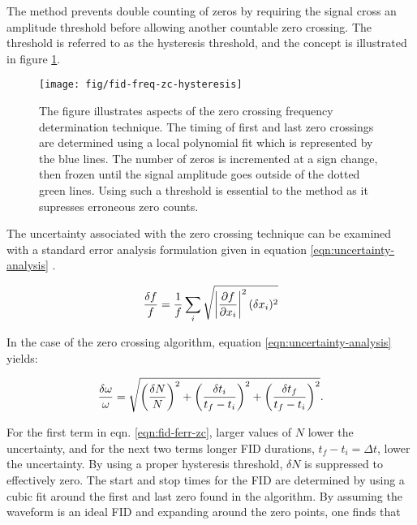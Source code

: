 \noindent
The method prevents double counting of zeros by requiring the signal cross an amplitude threshold before allowing another countable zero crossing.  The threshold is referred to as the hysteresis threshold, and the concept is illustrated in figure \ref{fig:fid-freq-zc-hysteresis}.

\begin{figure}
\label{fig:fid-freq-zc-hysteresis}
\texttt{[image: fig/fid-freq-zc-hysteresis]}
\caption{The figure illustrates aspects of the zero crossing frequency determination technique.  The timing of first and last zero crossings are determined using a local polynomial fit which is represented by the blue lines.  The number of zeros is incremented at a sign change, then frozen until the signal amplitude goes outside of the dotted green lines.  Using such a threshold is essential to the method as it supresses erroneous zero counts.}
\end{figure}

The uncertainty associated with the zero crossing technique can be examined with a standard error analysis formulation given in equation \ref{eqn:uncertainty-analysis} \cite{error-taylor}.

\begin{equation}
\label{eqn:uncertainty-analysis}
\frac{\delta f}{f} = \frac{1}{f} \sum_{i} \\
\sqrt{\left| \frac{\partial f}{\partial x_i} \right|^2 (\delta x_i)^2}
\end{equation}

\noindent
In the case of the zero crossing algorithm, equation \ref{eqn:uncertainty-analysis} yields:

\begin{equation}
\label{eqn:fid-ferr-zc}
\frac{\delta \omega}{\omega} = \\
\sqrt{
    \left( \frac{\delta N}{N} \right)^2 +
    \left( \frac{\delta t_i}{t_f - t_i} \right)^2 + 
    \left( \frac{\delta t_f}{t_f - t_i} \right)^2
    }.
\end{equation}

\noindent
For the first term in eqn. \ref{eqn:fid-ferr-zc}, larger values of $N$ lower the uncertainty, and for the next two terms longer FID durations, $t_f - t_i = \Delta t$, lower the uncertainty.  By using a proper hysteresis threshold, $\delta N$ is suppressed to effectively zero. The start and stop times for the FID are determined by using a cubic fit around the first and last zero found in the algorithm.  By assuming the waveform is an ideal FID and expanding around the zero points, one finds that 

